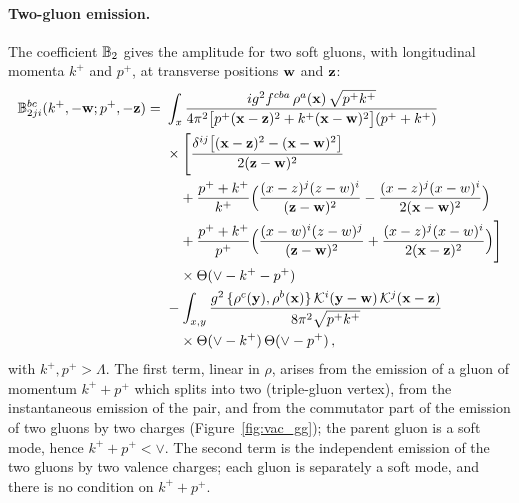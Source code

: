 \paragraph{Two-gluon emission.} The coefficient $\mathbb{B}_2$ gives the amplitude for two soft gluons, with longitudinal momenta $k^+$ and $p^+$, at transverse positions $\mathbf{w}$ and $\mathbf{z}$:
\begin{align}\label{eq:B2}
\mf B^{bc}_{2ji}(k^+,-\v w;p^+,-\v z)=\ &\int_x\frac{ig^2f^{cba}\,\rho^a(\v x)\,\sqrt{p^+k^+}}{4\pi^2\big[p^+(\v x-\v z)^2+k^+(\v x-\v w)^2\big](p^++k^+)}
\notag\\&\times\Bigg[\frac{\delta^{ij}\big[(\v x-\v z)^2-(\v x-\v w)^2\big]}{2(\v z-\v w)^2}
\notag\\&\quad
+\frac{p^++k^+}{k^+}\Big(\frac{(x-z)^j(z-w)^i}{(\v z-\v w)^2}-\frac{(x-z)^j(x-w)^i}{2(\v x-\v w)^2}\Big)
\notag\\&\quad
+\frac{p^++k^+}{p^+}\Big(\frac{(x-w)^i(z-w)^j}{(\v z-\v w)^2}+\frac{(x-z)^j(x-w)^i}{2(\v x-\v z)^2}\Big)\Bigg]
\notag\\&\quad\times\Theta(\vee-k^+-p^+)
\notag\\&
-\int_{x,y}\frac{g^2\,\{\rho^c(\v y),\rho^b(\v x)\}\,\Kv^i(\v y-\v w)\,\Kv^j(\v x-\v z)}{8\pi^2\sqrt{p^+k^+}}
\notag\\&\quad\times\Theta(\vee-k^+)\,\Theta(\vee-p^+)\,,
\end{align}
with $k^+,p^+>\Lambda$. The first term, linear in $\rho$, arises from the emission of a gluon of momentum $k^++p^+$ which splits into two (triple-gluon vertex), from the instantaneous emission of the pair, and from the commutator part of the emission of two gluons by two charges (Figure~\ref{fig:vac_gg}); the parent gluon is a soft mode, hence $k^++p^+<\vee$. The second term is the independent emission of the two gluons by two valence charges; each gluon is separately a soft mode, and there is no condition on $k^++p^+$.


